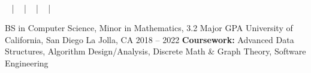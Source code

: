\documentclass[]{awesome-cv}
\begin{document}
\begin{center}
	\vspace{-5mm}
	  \\
	\vspace{2mm}
  \faEnvelope\  |
  \faMobile\  |
  \faLink\  |
  \faGithub\  |
  \faLinkedinSquare\ 
\end{center}
\vspace{-3mm}
\begin{cventries}
	\cventry
	{BS in Computer Science, Minor in Mathematics, 3.2 Major GPA}
	{University of California, San Diego}
	{La Jolla, CA}
	{2018 – 2022}
  {\textbf{Coursework:} Advanced Data Structures, Algorithm Design/Analysis,
  Discrete Math \& Graph Theory, Software Engineering}
\end{cventries}
\end{document}
